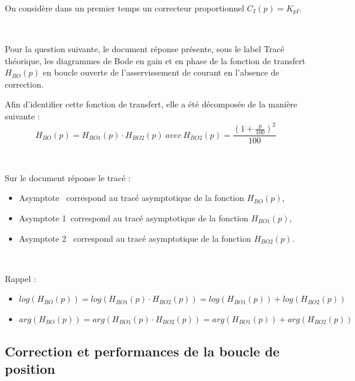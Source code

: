 On considère dans un premier temps un correcteur proportionnel $C_I(p) = K_{pI}$.

 ~\

Pour la question suivante, le document réponse présente, sous le label \og Tracé théorique\fg, les diagrammes de Bode en gain et en phase de la fonction de transfert $H_{BO}(p)$ en boucle ouverte de l'asservissement de courant en l'absence de correction.

Afin d'identifier cette fonction de transfert, elle a été décomposée de la manière suivante : \[H_{BO}(p)=H_{BO1}(p)\cdot H_{BO2}(p)\ avec\ H_{BO2}(p)=\frac{\left(1+\frac{p}{100}\right)^2}{100}\]

~\

Sur le document réponse le tracé : 
\begin{itemize}
 \item \og Asymptote \fg\ correspond au tracé asymptotique de la fonction $H_{BO}(p)$,
 \item \og Asymptote 1\fg\ correspond au tracé asymptotique de la fonction $H_{BO1}(p)$,
 \item \og Asymptote 2 \fg\ correspond au tracé asymptotique de la fonction $H_{BO2}(p)$.
\end{itemize}

~\

Rappel :
\begin{itemize}
 \item $log(H_{BO}(p))=log(H_{BO1}(p)\cdot H_{BO2}(p))=log(H_{BO1}(p))+log(H_{BO2}(p))$
 \item $arg(H_{BO}(p))=arg(H_{BO1}(p)\cdot H_{BO2}(p))=arg(H_{BO1}(p))+arg(H_{BO2}(p))$
\end{itemize}




\subsection{Correction et performances de la boucle de position}

